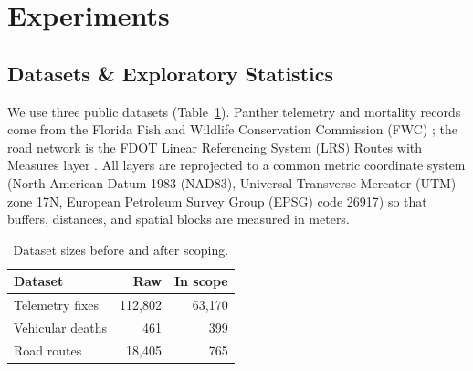 \documentclass[letterpaper]{article}
\begin{document}
\section{Experiments}

\subsection{Datasets \& Exploratory Statistics}
We use three public datasets (Table~\ref{tab:data}). Panther telemetry and mortality records come from the Florida Fish and Wildlife Conservation Commission (FWC) \cite{FWCPantherTelemetry,FWCPantherMortality}; the road network is the FDOT Linear Referencing System (LRS) Routes with Measures layer \cite{FDOTLRS}. All layers are reprojected to a common metric coordinate system (North American Datum 1983 (NAD83), Universal Transverse Mercator (UTM) zone 17N, European Petroleum Survey Group (EPSG) code 26917) so that buffers, distances, and spatial blocks are measured in meters.

\begin{table}[t]
\centering
\small
\begin{tabular}{lrr}
\hline
\textbf{Dataset} & \textbf{Raw} & \textbf{In scope} \\
\hline
Telemetry fixes & 112{,}802 & 63{,}170 \\
Vehicular deaths & 461 & 399 \\
Road routes & 18{,}405 & 765 \\
\hline
\end{tabular}
\caption{Dataset sizes before and after scoping.}
\label{tab:data}
\end{table}
\end{document}
